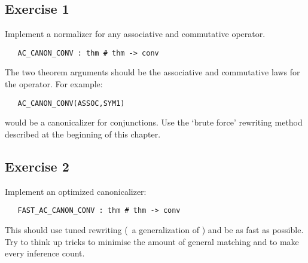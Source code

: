 \subsection{Exercise 1}

Implement a normalizer for any associative and commutative operator.

\begin{hol}\begin{verbatim}
   AC_CANON_CONV : thm # thm -> conv
\end{verbatim}\end{hol}

\noindent The two theorem arguments should be the
associative and commutative laws for the operator. For example:

\begin{hol}\begin{verbatim}
   AC_CANON_CONV(ASSOC,SYM1)
\end{verbatim}\end{hol}

\noindent would be a canonicalizer for conjunctions.
Use the `brute force' rewriting method described at the beginning of this chapter.

\subsection{Exercise 2}


Implement an optimized canonicalizer:

\begin{hol}\begin{verbatim}
   FAST_AC_CANON_CONV : thm # thm -> conv \end{verbatim}\end{hol}
\noindent This should use tuned rewriting (\eg\ a generalization of
) and be as fast as possible. Try to think up
tricks to minimise the amount of general matching and to make every
inference count.


